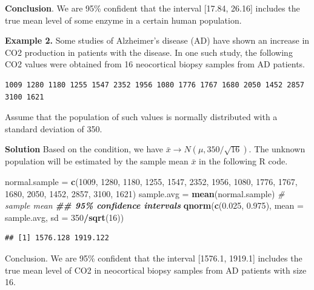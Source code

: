 \documentclass[
]{book}
\newenvironment{Shaded}{\begin{snugshade}}{\end{snugshade}}
\newcommand{\AttributeTok}[1]{\textcolor[rgb]{0.13,0.29,0.53}{#1}}
\newcommand{\CommentTok}[1]{\textcolor[rgb]{0.56,0.35,0.01}{\textit{#1}}}
\newcommand{\DecValTok}[1]{\textcolor[rgb]{0.00,0.00,0.81}{#1}}
\newcommand{\DocumentationTok}[1]{\textcolor[rgb]{0.56,0.35,0.01}{\textbf{\textit{#1}}}}
\newcommand{\FloatTok}[1]{\textcolor[rgb]{0.00,0.00,0.81}{#1}}
\newcommand{\FunctionTok}[1]{\textcolor[rgb]{0.13,0.29,0.53}{\textbf{#1}}}
\newcommand{\NormalTok}[1]{#1}
\newcommand{\OtherTok}[1]{\textcolor[rgb]{0.56,0.35,0.01}{#1}}
\newcommand{\SpecialCharTok}[1]{\textcolor[rgb]{0.81,0.36,0.00}{\textbf{#1}}}
\begin{document}
\textbf{Conclusion}. We are 95\% confident that the interval {[}17.84, 26.16{]} includes the true mean level of some enzyme in a certain human population.

\textbf{Example 2.} Some studies of Alzheimer's disease (AD) have shown an increase in CO2 production in patients with the disease. In one such study, the following CO2 values were obtained from 16 neocortical biopsy samples from AD patients.

\begin{verbatim}
1009 1280 1180 1255 1547 2352 1956 1080 1776 1767 1680 2050 1452 2857 3100 1621
\end{verbatim}

Assume that the population of such values is normally distributed with a standard deviation of 350.

\textbf{Solution} Based on the condition, we have \(\bar{x} \to N(\mu, 350/\sqrt{16})\). The unknown population will be estimated by the sample mean \(\bar{x}\) in the following R code.

\begin{Shaded}
\begin{Highlighting}[]
\NormalTok{normal.sample }\OtherTok{=} \FunctionTok{c}\NormalTok{(}\DecValTok{1009}\NormalTok{, }\DecValTok{1280}\NormalTok{, }\DecValTok{1180}\NormalTok{, }\DecValTok{1255}\NormalTok{, }\DecValTok{1547}\NormalTok{, }\DecValTok{2352}\NormalTok{, }\DecValTok{1956}\NormalTok{, }\DecValTok{1080}\NormalTok{, }\DecValTok{1776}\NormalTok{, }\DecValTok{1767}\NormalTok{, }
                  \DecValTok{1680}\NormalTok{, }\DecValTok{2050}\NormalTok{, }\DecValTok{1452}\NormalTok{, }\DecValTok{2857}\NormalTok{, }\DecValTok{3100}\NormalTok{, }\DecValTok{1621}\NormalTok{)}
\NormalTok{sample.avg }\OtherTok{=} \FunctionTok{mean}\NormalTok{(normal.sample)    }\CommentTok{\# sample mean}
\DocumentationTok{\#\# 95\% confidence intervals}
\FunctionTok{qnorm}\NormalTok{(}\FunctionTok{c}\NormalTok{(}\FloatTok{0.025}\NormalTok{, }\FloatTok{0.975}\NormalTok{), }\AttributeTok{mean =}\NormalTok{ sample.avg, }\AttributeTok{sd =} \DecValTok{350}\SpecialCharTok{/}\FunctionTok{sqrt}\NormalTok{(}\DecValTok{16}\NormalTok{))}
\end{Highlighting}
\end{Shaded}

\begin{verbatim}
## [1] 1576.128 1919.122
\end{verbatim}

Conclusion. We are 95\% confident that the interval {[}1576.1, 1919.1{]} includes the true mean level of CO2 in neocortical biopsy samples from AD patients with size 16.
\end{document}
